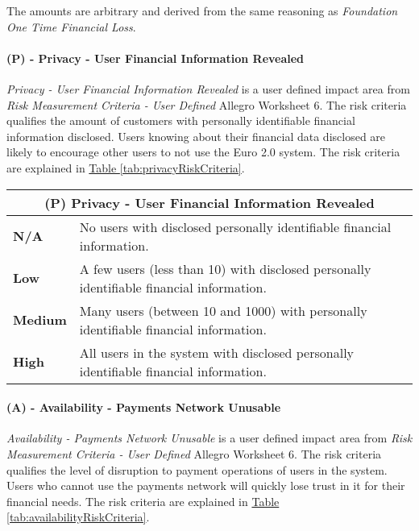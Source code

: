 \documentclass[12pt]{article} %
\newcommand{\hypertableref}[1]{\hyperref[#1]{Table \ref{#1}}}
\begin{document}
{The amounts are arbitrary and derived from the same reasoning as \textit{Foundation One Time Financial Loss}.

\paragraph{(P) - Privacy - User Financial Information Revealed}

\textit{Privacy - User Financial Information Revealed} is a user defined impact area from \textit{Risk Measurement Criteria - User Defined} Allegro Worksheet 6. The risk criteria qualifies the amount of customers with personally identifiable financial information disclosed. Users knowing about their financial data disclosed are likely to encourage other users to not use the Euro 2.0 system. The risk criteria are explained in \hypertableref{tab:privacyRiskCriteria}.

\begin{center}
\begin{tabular}{ | l | p{12cm} | }
  \hline
  \multicolumn{2}{|c|}{\textbf{(P) Privacy - User Financial Information Revealed}}
  \\ \hline
  \textbf{N/A} & No users with disclosed personally identifiable financial information.
  \\ \hline
  \textbf{Low} & A few users (less than 10) with disclosed personally identifiable financial information.
  \\ \hline
  \textbf{Medium} & Many users (between 10 and 1000) with personally identifiable financial information.
  \\ \hline
  \textbf{High} & All users in the system with disclosed personally identifiable financial information.
  \\ \hline
\end{tabular}
\end{center}
\label{tab:privacyRiskCriteria}

\paragraph{(A) - Availability - Payments Network Unusable}

\textit{Availability - Payments Network Unusable} is a user defined impact area from \textit{Risk Measurement Criteria - User Defined} Allegro Worksheet 6. The risk criteria qualifies the level of disruption to payment operations of users in the system. Users who cannot use the payments network will quickly lose trust in it for their financial needs. The risk criteria are explained in \hypertableref{tab:availabilityRiskCriteria}.

}
\end{document}
